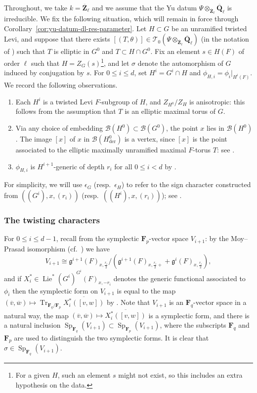 \documentclass[reqno]{amsart}
\numberwithin{equation}{subsection}
\newcommand{\F}{\mathbf{F}}
\newcommand{\Q}{\mathbf{Q}}
\newcommand{\Z}{\mathbf{Z}}
\newcommand{\ol}[1]{\overline{#1}}
\newcommand\cB{\mathcal{B}}
\newcommand\cT{\mathcal{T}}
\newcommand\frg{\mathfrak{g}}
\DeclareMathOperator{\Tr}{Tr}
\DeclareMathOperator{\Sp}{Sp}
\DeclareMathOperator{\Lie}{Lie}
\DeclareMathOperator{\der}{der}
\theoremstyle{remark}
\numberwithin{equation}{subsection}
\numberwithin{figure}{subsection}
\begin{document}
Throughout, we take $k = \ol\Z_\ell$ and we assume that the Yu datum $\Psi \otimes_{\ol\Z_\ell} \ol\Q_\ell$ is irreducible. We fix the following situation, which will remain in force through Corollary~\ref{cor:yu-datum-dl-res-parameter}. Let $H \subset G$ be an unramified twisted Levi, and suppose that there exists $[(T, \theta)] \in \cT_0(\Psi \otimes_{\ol\Z_\ell} \ol\Q_\ell)$ (in the notation of \cite[Definition~7.2.1]{CF26a}) such that $T$ is elliptic in $G^0$ and $T \subset H \cap G^0$. Fix an element $s \in H(F)$ of order $\ell$ such that $H = Z_G(s)$\footnote{For a given $H$, such an element $s$ might not exist, so this includes an extra hypothesis on the data.}, and let $\sigma$ denote the automorphism of $G$ induced by conjugation by $s$. For $0 \leq i \leq d$, set $H^i = G^i \cap H$ and $\phi_{H,i} = \phi_i|_{H^i(F)}$. We record the following observations.
\begin{enumerate}
\item Each $H^i$ is a twisted Levi $F$-subgroup of $H$, and $Z_{H^0}/Z_H$ is anisotropic: this follows from the assumption that $T$ is an elliptic maximal torus of $G$.
\item Via any choice of embedding $\cB(H^0) \subset \cB(G^0)$, the point $x$ lies in $\cB(H^0)$. The image $[x]$ of $x$ in $\cB(H^0_{\der})$ is a vertex, since $[x]$ is the point associated to the elliptic maximally unramified maximal $F$-torus $T$: see \cite[Remark 16.7]{KP}.
\item $\phi_{H,i}$ is $H^{i+1}$-generic of depth $r_i$ for all $0\leq i < d$ by \cite[Lemma~9.3.1]{CF26a}.
\end{enumerate}
For simplicity, we will use $\epsilon_G$ (resp.\ $\epsilon_H$) to refer to the sign character constructed from $((G^i), x, (r_i))$ (resp.\ $((H^i), x, (r_i))$); see \cite[\S\S 3.3 and 6.5]{CF26a}.

\subsubsection{The twisting characters}\label{sss:levi-descent-twisting}

For $0 \leq i \leq d-1$, recall from \cite[\S 6.3]{CF26a} the symplectic $\F_p$-vector space $V_{i+1}$: by the Moy--Prasad isomorphism (cf.\ \cite[(6.3.1)]{CF26a}) we have
\[
V_{i+1} \cong \frg^{i+1}(F)_{x,\frac{r_i}{2}}/\left(\frg^{i+1}(F)_{x,\frac{r_i}{2}+} + \frg^i(F)_{x,\frac{r_i}{2}}\right),
\]
and if $X_i^*\in \Lie^*(G^i)^{G^i}(F)_{x, -r_i}$ denotes the generic functional associated to $\phi_i$ then the symplectic form on $V_{i+1}$ is equal to the map $(\ol v, \ol w) \mapsto \Tr_{\F_q/\F_p}\overline{X_i^*([v,w])}$ by \cite[Lemma~6.3.1]{CF26a}. Note that $V_{i+1}$ is an $\F_q$-vector space in a natural way, the map $(\ol v, \ol w) \mapsto \overline{X_i^*([v,w])}$ is a symplectic form, and there is a natural inclusion $\Sp_{\F_q}(V_{i+1}) \subset \Sp_{\F_p}(V_{i+1})$, where the subscripts $\F_q$ and $\F_p$ are used to distinguish the two symplectic forms. It is clear that $\sigma \in \Sp_{\F_q}(V_{i+1})$.
\end{document}
